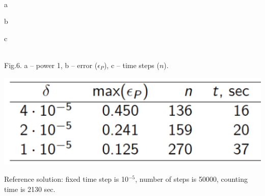 \documentclass[a1paper,fontscale=0.6]{poster}
\begin{document}
\begin{poster}
{\begin{center}
\begin{minipage}{0.3\linewidth}
 \\
\end{minipage}

\begin{minipage}{0.051\linewidth}
\end{minipage}
\hfill
\begin{minipage}{0.25\linewidth}
\hspace{2em} a \\
\end{minipage}
\hfill
\begin{minipage}{0.25\linewidth}
\hspace{2em} b \\
\end{minipage}
\hfill
\begin{minipage}{0.25\linewidth}
\hspace{3em} c \\
\end{minipage}
\\
\vspace{-1em}
\footnotesize{Fig.6. a -- power 1, b -- error ($\epsilon_P$), c -- time steps ($n$).}
\end{center}

\begin{center}
\includegraphics[width=0.5\linewidth]{timestep/table.png}
\end{center}
\vspace{-1em}
Reference solution: fixed time step is 10$^{-5}$, number of steps is 50000,
counting time is 2130 sec.
}


\end{poster}
\end{document}
